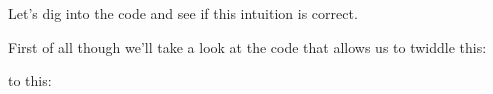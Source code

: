 Let's dig into the code and see if this intuition is correct.

First of all though we'll take a look at the code that allows us to
twiddle this:

    \begin{adjustbox}{width=9cm}
    \end{adjustbox}

to this:

    \begin{adjustbox}{width=8.2cm}
    \end{adjustbox}

\clearpage

